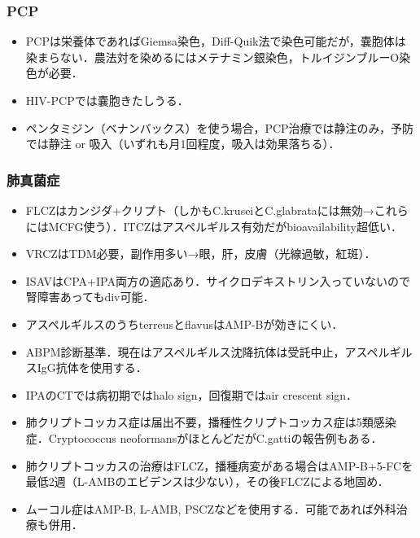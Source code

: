 \subsubsection{PCP}

\begin{itemize}
\item PCPは栄養体であればGiemsa染色，Diff-Quik法で染色可能だが，嚢胞体は染まらない．農法対を染めるにはメテナミン銀染色，トルイジンブルーO染色が必要．
\item HIV-PCPでは嚢胞きたしうる．
\item ペンタミジン（ベナンバックス）を使う場合，PCP治療では静注のみ，予防では静注 or 吸入（いずれも月1回程度，吸入は効果落ちる）．

\end{itemize}
\subsubsection{肺真菌症}
\begin{itemize}


\item FLCZはカンジダ+クリプト（しかもC.kruseiとC.glabrataには無効→これらにはMCFG使う）．ITCZはアスペルギルス有効だがbioavailability超低い．
\item VRCZはTDM必要，副作用多い→眼，肝，皮膚（光線過敏，紅斑）．
\item ISAVはCPA+IPA両方の適応あり．サイクロデキストリン入っていないので腎障害あってもdiv可能．
\item アスペルギルスのうちterreusとflavusはAMP-Bが効きにくい．
\item ABPM診断基準．現在はアスペルギルス沈降抗体は受託中止，アスペルギルスIgG抗体を使用する．


\item IPAのCTでは病初期ではhalo sign，回復期ではair crescent sign．
\item 肺クリプトコッカス症は届出不要，播種性クリプトコッカス症は5類感染症．Cryptococcus neoformansがほとんどだがC.gattiの報告例もある．
\item 肺クリプトコッカスの治療はFLCZ，播種病変がある場合はAMP-B+5-FCを最低2週（L-AMBのエビデンスは少ない），その後FLCZによる地固め．
\item ムーコル症はAMP-B, L-AMB, PSCZなどを使用する．可能であれば外科治療も併用．


\end{itemize}


